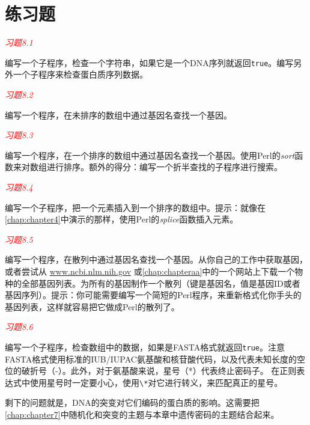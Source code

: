 \section{练习题}
\textcolor{red}{\textit{习题8.1}}
\begin{adjustwidth}{1cm}{}
编写一个子程序，检查一个字符串，如果它是一个DNA序列就返回\verb|true|。编写另外一个子程序来检查蛋白质序列数据。
\end{adjustwidth}

\textcolor{red}{\textit{习题8.2}}
\begin{adjustwidth}{1cm}{}
编写一个程序，在未排序的数组中通过基因名查找一个基因。
\end{adjustwidth}

\textcolor{red}{\textit{习题8.3}}
\begin{adjustwidth}{1cm}{}
编写一个程序，在一个排序的数组中通过基因名查找一个基因。使用Perl的\textit{sort}函数来对数组进行排序。额外的得分：编写一个折半查找的子程序进行搜索。
\end{adjustwidth}

\textcolor{red}{\textit{习题8.4}}
\begin{adjustwidth}{1cm}{}
编写一个子程序，把一个元素插入到一个排序的数组中。提示：就像在\autoref{chap:chapter4}中演示的那样，使用Perl的\textit{splice}函数插入元素。
\end{adjustwidth}

\textcolor{red}{\textit{习题8.5}}
\begin{adjustwidth}{1cm}{}
编写一个程序，在散列中通过基因名查找一个基因。从你自己的工作中获取基因，或者尝试从 \href{www.ncbi.nlm.nih.gov}{www.ncbi.nlm.nih.gov} 或\autoref{chap:chapteraa}中的一个网站上下载一个物种的全部基因列表。为所有的基因制作一个散列（键是基因名，值是基因ID或者基因序列）。提示：你可能需要编写一个简短的Perl程序，来重新格式化你手头的基因列表，这样就容易把它做成Perl的散列了。
\end{adjustwidth}

\textcolor{red}{\textit{习题8.6}}
\begin{adjustwidth}{1cm}{}
编写一个子程序，检查数组中的数据，如果是FASTA格式就返回\verb|true|。注意FASTA格式使用标准的IUB/IUPAC氨基酸和核苷酸代码，以及代表未知长度的空位的破折号（-）。此外，对于氨基酸来说，星号（*）代表终止密码子。 在正则表达式中使用星号时一定要小心，使用\verb|\*|对它进行转义，来匹配真正的星号。
\end{adjustwidth}

剩下的问题就是，DNA的突变对它们编码的蛋白质的影响。这需要把\autoref{chap:chapter7}中随机化和突变的主题与本章中遗传密码的主题结合起来。

